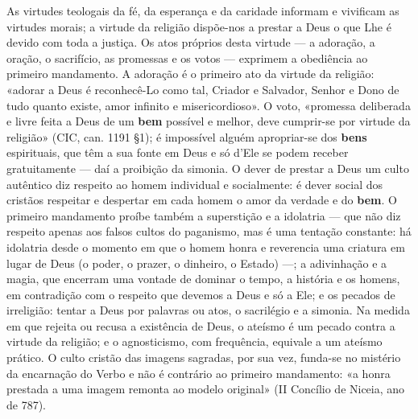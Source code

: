 As virtudes teologais da fé, da esperança e da caridade informam e vivificam as virtudes morais; a virtude da religião dispõe-nos a prestar a Deus o que Lhe é devido com toda a justiça. Os atos próprios desta virtude --- a adoração, a oração, o sacrifício, as promessas e os votos --- exprimem a obediência ao primeiro mandamento. A adoração é o primeiro ato da virtude da religião: «adorar a Deus é reconhecê-Lo como tal, Criador e Salvador, Senhor e Dono de tudo quanto existe, amor infinito e misericordioso». O voto, «promessa deliberada e livre feita a Deus de um \textbf{bem} possível e melhor, deve cumprir-se por virtude da religião» (CIC, can. 1191 §1); é impossível alguém apropriar-se dos \textbf{bens} espirituais, que têm a sua fonte em Deus e só d'Ele se podem receber gratuitamente --- daí a proibição da simonia. O dever de prestar a Deus um culto autêntico diz respeito ao homem individual e socialmente: é dever social dos cristãos respeitar e despertar em cada homem o amor da verdade e do \textbf{bem}. O primeiro mandamento proíbe também a superstição e a idolatria --- que não diz respeito apenas aos falsos cultos do paganismo, mas é uma tentação constante: há idolatria desde o momento em que o homem honra e reverencia uma criatura em lugar de Deus (o poder, o prazer, o dinheiro, o Estado) ---; a adivinhação e a magia, que encerram uma vontade de dominar o tempo, a história e os homens, em contradição com o respeito que devemos a Deus e só a Ele; e os pecados de irreligião: tentar a Deus por palavras ou atos, o sacrilégio e a simonia. Na medida em que rejeita ou recusa a existência de Deus, o ateísmo é um pecado contra a virtude da religião; e o agnosticismo, com frequência, equivale a um ateísmo prático. O culto cristão das imagens sagradas, por sua vez, funda-se no mistério da encarnação do Verbo e não é contrário ao primeiro mandamento: «a honra prestada a uma imagem remonta ao modelo original» (II Concílio de Niceia, ano de 787).

